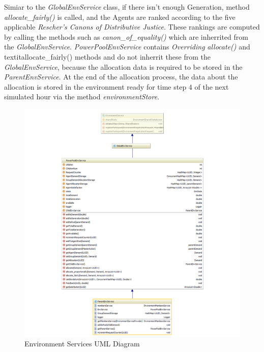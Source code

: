 Simiar to the \textit{GlobalEnvService} class, if there isn't enough Generation, method \textit{allocate\_fairly()} is called, and the Agents are ranked according to the five applicable \textit{Rescher's Canons of Distributive Justice}. These rankings are computed by calling the methods such as \textit{canon\_of\_equality()} which are inherrited from the \textit{GlobalEnvService}. \textit{PowerPoolEnvService} contains \textit{Overriding} \textit{allocate()} and textit{allocate\_fairly()} methods and do not inherrit these from the \textit{GlobalEnvService}, because the allocation data is required to be stored in the \textit{ParentEnvService}. At the end of the allocation process, the data about the allocation is stored in the environment ready for time step 4 of the next simulated hour via the method \textit{environmentStore}.

\begin{figure}[!h]
	\centering
	\includegraphics[scale=0.3]{Images/EnvironmentUML-2.png}
	\caption{Environment Services UML Diagram}
	\label{fig:ServiceUML2}
\end{figure}

